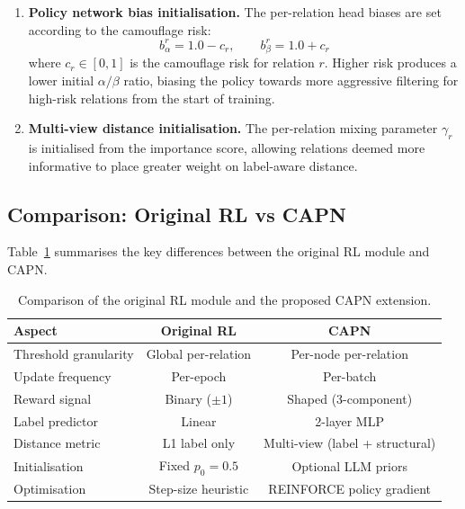 \begin{enumerate}
    \item \textbf{Policy network bias initialisation.} The per-relation head biases are set according to the camouflage risk:
    \begin{equation}
    b_{\alpha}^r = 1.0 - c_r, \qquad b_{\beta}^r = 1.0 + c_r
    \end{equation}
    where \( c_r \in [0, 1] \) is the camouflage risk for relation \( r \). Higher risk produces a lower initial \( \alpha/\beta \) ratio, biasing the policy towards more aggressive filtering for high-risk relations from the start of training.

    \item \textbf{Multi-view distance initialisation.} The per-relation mixing parameter \( \gamma_r \) is initialised from the importance score, allowing relations deemed more informative to place greater weight on label-aware distance.
\end{enumerate}

\subsection{Comparison: Original RL vs CAPN}

Table~\ref{tab:rl-vs-capn} summarises the key differences between the original RL module and CAPN.

\begin{table}[h!]
\centering
\begin{tabular}{|l|c|c|}
\hline
\textbf{Aspect} & \textbf{Original RL} & \textbf{CAPN} \\
\hline
Threshold granularity & Global per-relation & Per-node per-relation \\
Update frequency & Per-epoch & Per-batch \\
Reward signal & Binary (\( \pm 1 \)) & Shaped (3-component) \\
Label predictor & Linear & 2-layer MLP \\
Distance metric & L1 label only & Multi-view (label + structural) \\
Initialisation & Fixed \( p_0 = 0.5 \) & Optional LLM priors \\
Optimisation & Step-size heuristic & REINFORCE policy gradient \\
\hline
\end{tabular}
\caption{Comparison of the original RL module and the proposed CAPN extension.}
\label{tab:rl-vs-capn}
\end{table}

